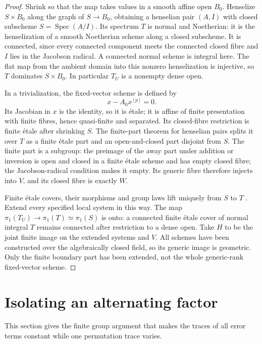 \documentclass[11pt]{article}
\theoremstyle{remark}\newtheorem{remark}[theorem]{Remark}
\newcommand{\Spec}{\operatorname{Spec}}
\begin{document}
\begin{proof}
Shrink so that the map takes values in a smooth affine open $B_0$. Henselize $S\times B_0$ along the graph of $S\to B_0$, obtaining a henselian pair $(A,I)$ with closed subscheme $S=\Spec(A/I)$. Its spectrum $T$ is normal and Noetherian: it is the henselization of a smooth Noetherian scheme along a closed subscheme. It is connected, since every connected component meets the connected closed fibre and $I$ lies in the Jacobson radical. A connected normal scheme is integral here. The flat map from the ambient domain into this nonzero henselization is injective, so $T$ dominates $S\times B_0$. In particular $T_U$ is a nonempty dense open.

In a trivialization, the fixed-vector scheme is defined by
\[
                            x-A_0x^{[p]}=0.
\]
Its Jacobian in $x$ is the identity, so it is \'etale; it is affine of finite presentation with finite fibres, hence quasi-finite and separated. Its closed-fibre restriction is finite \'etale after shrinking $S$. The finite-part theorem for henselian pairs \citep[Lemma~41.20.5, full proof]{StacksFinitePart} splits it over $T$ as a finite \'etale part and an open-and-closed part disjoint from $S$. The finite part is a subgroup: the preimage of the away part under addition or inversion is open and closed in a finite \'etale scheme and has empty closed fibre; the Jacobson-radical condition makes it empty. Its generic fibre therefore injects into $V$, and its closed fibre is exactly $W$.

Finite \'etale covers, their morphisms and group laws lift uniquely from $S$ to $T$ \citep[Lemma~58.8.2]{StacksHenselian}. Extend every specified local system in this way. The map $\pi_1(T_U)\to\pi_1(T)\simeq\pi_1(S)$ is onto: a connected finite \'etale cover of normal integral $T$ remains connected after restriction to a dense open. Take $H$ to be the joint finite image on the extended systems and $V$. All schemes have been constructed over the algebraically closed field, so its generic image is geometric. Only the finite boundary part has been extended, not the whole generic-rank fixed-vector scheme.
\end{proof}

\section{Isolating an alternating factor}\label{sec:group}

This section gives the finite group argument that makes the traces of all error terms constant while one permutation trace varies.
\end{document}
